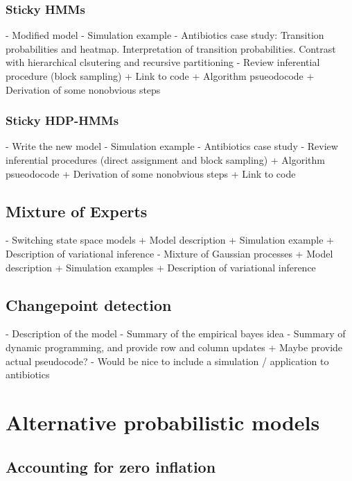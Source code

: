 \documentclass{article}
\begin{document}
\subsubsection{Sticky HMMs}

- Modified model
- Simulation example
- Antibiotics case study: Transition probabilities and heatmap. Interpretation
of transition probabilities. Contrast with hierarchical clsutering and recursive
partitioning
- Review inferential procedure (block sampling)
  + Link to code
  + Algorithm psueodocode
  + Derivation of some nonobvious steps

\subsubsection{Sticky HDP-HMMs}

- Write the new model
- Simulation example
- Antibiotics case study
- Review inferential procedures (direct assignment and block sampling)
  + Algorithm psueodocode
  + Derivation of some nonobvious steps
  + Link to code

\subsection{Mixture of Experts}

- Switching state space models
   + Model description
   + Simulation example
   + Description of variational inference
- Mixture of Gaussian processes
  + Model description
  + Simulation examples
  + Description of variational inference

\subsection{Changepoint detection}

- Description of the model
- Summary of the empirical bayes idea
- Summary of dynamic programming, and provide row and column updates
  + Maybe provide actual pseudocode?
- Would be nice to include a simulation / application to antibiotics


\section{Alternative probabilistic models}
\label{sec:alternative_probabilistic_models}
\subsection{Accounting for zero inflation}
\end{document}
